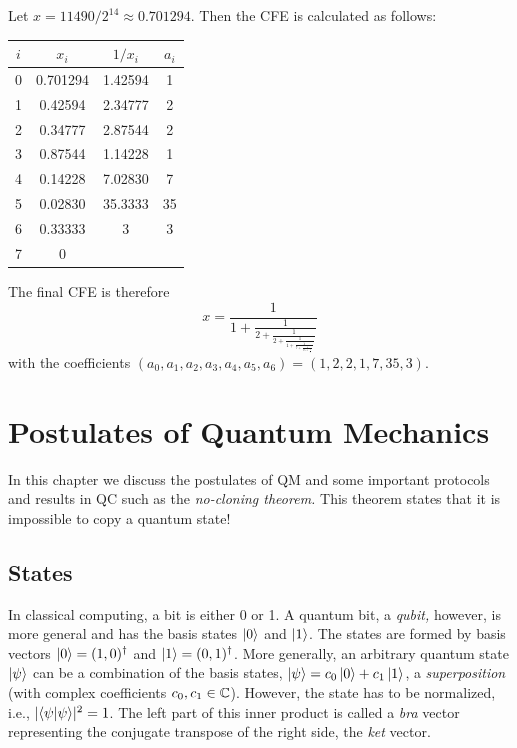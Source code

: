 		\begin{example}
			Let \( x = \num{11490} / 2^{14} \approx 0.701294 \). Then the \ac{CFE} is calculated as follows:
			\begin{center}
				\begin{tabular}{c|ccc}
					\toprule
					 \(i\)  &	\(x_i\)	 &  \(1 / x_i\)  & \(a_i\)  \\ \midrule
					\num{0} & \num{0.701294} & \num{1.42594} & \num{1}  \\ \bottomrule
					\num{1} & \num{0.42594}  & \num{2.34777} & \num{2}  \\ \bottomrule
					\num{2} & \num{0.34777}  & \num{2.87544} & \num{2}  \\ \bottomrule
					\num{3} & \num{0.87544}  & \num{1.14228} & \num{1}  \\ \bottomrule
					\num{4} & \num{0.14228}  & \num{7.02830} & \num{7}  \\ \bottomrule
					\num{5} & \num{0.02830}  & \num{35.3333} & \num{35} \\ \bottomrule
					\num{6} & \num{0.33333}  &	\num{3}	& \num{3}  \\ \bottomrule
					\num{7} &	\num{0}	 &			   &		  \\ \bottomrule
				\end{tabular}
			\end{center}
			The final \ac{CFE} is therefore
			\begin{equation}
				x = \frac{1}{1 + \frac{1}{2 + \frac{1}{2 + \frac{1}{1 + \frac{1}{7 + \frac{1}{35 + \frac{1}{3}}}}}}}
			\end{equation}
			with the coefficients \( (a_0, a_1, a_2, a_3, a_4, a_5, a_6) = (1, 2, 2, 1, 7, 35, 3) \).
		\end{example}

\chapter{Postulates of Quantum Mechanics}
	In this chapter we discuss the postulates of \ac{QM} and some important protocols and results in \ac{QC} such as the \emph{no-cloning theorem.} This theorem states that it is impossible to copy a quantum state!

	\section{States}
		In classical computing, a bit is either \num{0} or \num{1}. A quantum bit, a \emph{qubit,} however, is more general and has the basis states \(\ket{0}\) and \(\ket{1}\). The states are formed by basis vectors \( \ket{0} = (1, 0)^\dagger \) and \( \ket{1} = (0, 1)^\dagger \). More generally, an arbitrary quantum state \(\ket{\psi}\) can be a combination of the basis states, \( \ket{\psi} = c_0 \ket{0} + c_1 \ket{1} \), a \emph{superposition} (with complex coefficients \( c_0, c_1 \in \mathbb{C} \)). However, the state has to be normalized, i.e., \( \lvert \braket{\psi}{\psi} \rvert^2 = 1 \). The left part of this inner product is called a \emph{bra} vector representing the conjugate transpose of the right side, the \emph{ket} vector.

